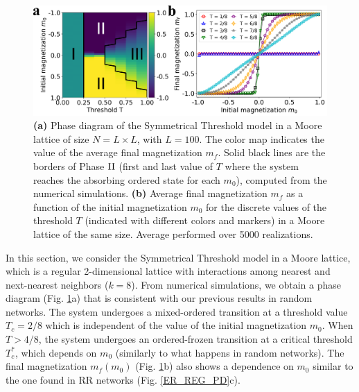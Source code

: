 \begin{figure}
		\centering \captionsetup{font=sf}
		\includegraphics[width=\textwidth]{Figs/Aging_STM/FIG9.pdf}
		\caption[Symmetrical Threshold model in a Moore lattice]{\label{LAT_PD} \textbf{(a)} Phase diagram of the Symmetrical Threshold model in a Moore lattice of size $N = L \times L$, with $L = 100$. The color map indicates the value of the average final magnetization $m_f$. Solid black lines are the borders of Phase ${\rm II}$ (first and last value of $T$ where the system reaches the absorbing ordered state for each $m_0$), computed from the numerical simulations. \textbf{(b)} Average final magnetization $m_f$ as a function of the initial magnetization $m_0$ for the discrete values of the threshold $T$ (indicated with different colors and markers) in a Moore lattice of the same size. Average performed over 5000 realizations.}
\end{figure}

In this section, we consider the Symmetrical Threshold model in a Moore lattice, which is a regular 2-dimensional lattice with interactions among nearest and next-nearest neighbors ($k=8$).  From numerical simulations, we obtain a phase diagram (Fig. \ref{LAT_PD}a) that is consistent with our previous results in random networks. The system undergoes a mixed-ordered transition at a threshold value $T_{c} = 2/8$  which is independent of the value of the initial magnetization $m_0$. When $T > 4/8$, the system undergoes an ordered-frozen transition at a critical threshold $T_{c}^{*}$, which depends on $m_0$ (similarly to what happens in random networks). The final magnetization $m_f(m_0)$ (Fig. \ref{LAT_PD}b) also shows a dependence on $m_0$ similar to the one found in RR networks (Fig. \ref{ER_REG_PD}c).

